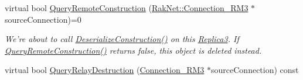 \begin{DoxyCompactItemize}
virtual bool \hyperlink{class_rak_net_1_1_replica3_a79bd207fb79055d2b39943eb1c6b1f58}{Query\-Remote\-Construction} (\hyperlink{class_rak_net_1_1_connection___r_m3}{Rak\-Net\-::\-Connection\-\_\-\-R\-M3} $\ast$source\-Connection)=0
\begin{DoxyCompactList}\small\item\em We're about to call \hyperlink{class_rak_net_1_1_replica3_a8e18c95612054b601ce0149f91a5a34d}{Deserialize\-Construction()} on this \hyperlink{class_rak_net_1_1_replica3}{Replica3}. If \hyperlink{class_rak_net_1_1_replica3_a79bd207fb79055d2b39943eb1c6b1f58}{Query\-Remote\-Construction()} returns false, this object is deleted instead. \end{DoxyCompactList}\item 
\hypertarget{class_rak_net_1_1_replica3_a2e6e18213d1c45012157149148994299}{virtual bool \hyperlink{class_rak_net_1_1_replica3_a2e6e18213d1c45012157149148994299}{Query\-Relay\-Destruction} (\hyperlink{class_rak_net_1_1_connection___r_m3}{Connection\-\_\-\-R\-M3} $\ast$source\-Connection) const }\label{class_rak_net_1_1_replica3_a2e6e18213d1c45012157149148994299}


\end{DoxyCompactItemize}
